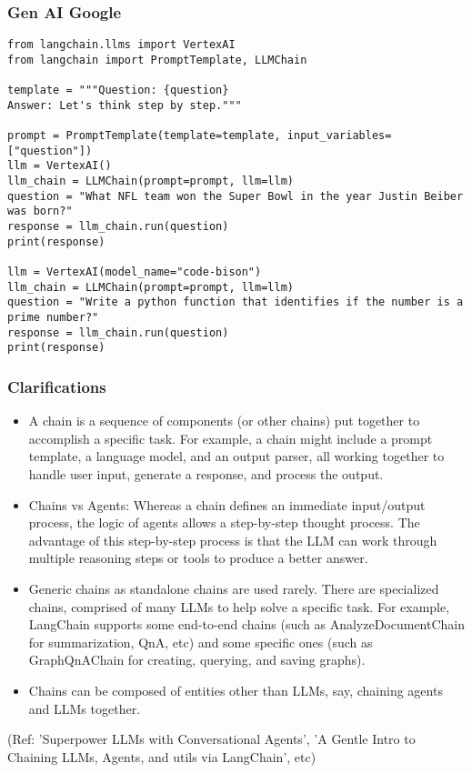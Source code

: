 \begin{frame}[fragile]\frametitle{Gen AI Google}


\begin{lstlisting}
from langchain.llms import VertexAI
from langchain import PromptTemplate, LLMChain

template = """Question: {question}
Answer: Let's think step by step."""

prompt = PromptTemplate(template=template, input_variables=["question"])
llm = VertexAI()
llm_chain = LLMChain(prompt=prompt, llm=llm)
question = "What NFL team won the Super Bowl in the year Justin Beiber was born?"
response = llm_chain.run(question)
print(response)

llm = VertexAI(model_name="code-bison")
llm_chain = LLMChain(prompt=prompt, llm=llm)
question = "Write a python function that identifies if the number is a prime number?"
response = llm_chain.run(question)
print(response)
\end{lstlisting}


\end{frame}




\begin{frame}[fragile]\frametitle{Clarifications}

\begin{itemize}
\item A chain is a sequence of components (or other chains) put together to accomplish a specific task. For example, a chain might include a prompt template, a language model, and an output parser, all working together to handle user input, generate a response, and process the output.
\item Chains vs Agents: Whereas a chain defines an immediate input/output process, the logic of agents allows a step-by-step thought process. The advantage of this step-by-step process is that the LLM can work through multiple reasoning steps or tools to produce a better answer.
\item Generic chains as standalone chains are used rarely. There are specialized chains, comprised of many LLMs to help solve a specific task. For example, LangChain supports some end-to-end chains (such as AnalyzeDocumentChain for summarization, QnA, etc) and some specific ones (such as GraphQnAChain for creating, querying, and saving graphs). 
\item Chains can be composed of entities other than LLMs, say, chaining agents and LLMs together.
\end{itemize}

{\tiny (Ref: 'Superpower LLMs with Conversational Agents', 'A Gentle Intro to Chaining LLMs, Agents, and utils via LangChain', etc)}
\end{frame}

